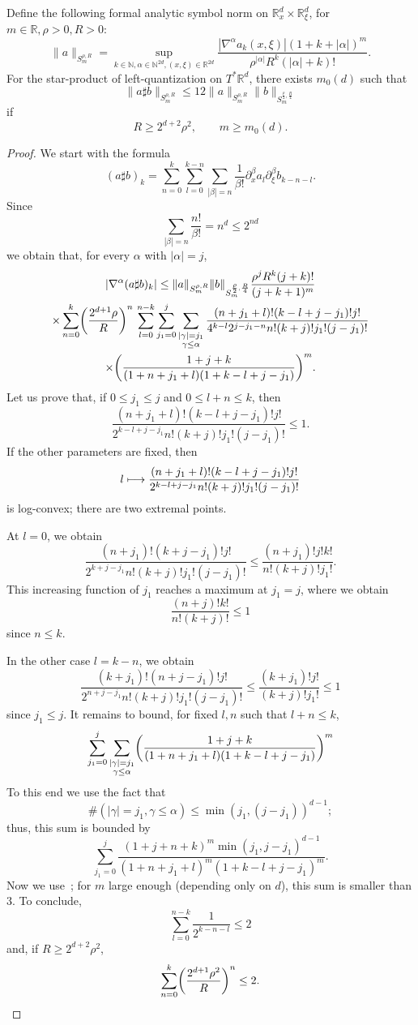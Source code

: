 \documentclass[AHL,Unicode,longabstracts,published]{cedram}
\newcommand\1{\mathds{1}}
\newcommand{\R}{\mathbb{R}}
\newcommand{\N}{\mathbb{N}}
\let\oldmapsto\mapsto
\renewcommand*{\mapsto}{\mathchoice{\longmapsto}{\oldmapsto}{\oldmapsto}{\oldmapsto}}
\let\originalleft\left
\let\originalright\right
\renewcommand{\left}{\mathopen{}\mathclose\bgroup\originalleft}
\renewcommand{\right}{\aftergroup\egroup\originalright}
\begin{document}
\begin{prop}\label{prop:composition-formal}
Define the following formal analytic symbol norm on $\R^{d}_x\times \R^d_{\xi}$, for $m\in \R, \rho>0,R>0$:
\[
\|a\|_{S^{\rho,R}_m}=\sup_{k\in \N, \alpha\in \N^{2d}, (x,\xi)\in
\R^{2d}}\frac{|\nabla^{\alpha}a_k(x,\xi)|(1+k+|\alpha|)^m}{\rho^{|\alpha|}R^k(|\alpha|+k)!}.
\]
For the star-product of left-quantization on $T^*\R^d$, there exists $m_0(d)$ such that
\[
\|a\sharp b\|_{S^{\rho,R}_m}\leq 12\|a\|_{S^{\rho,R}_m}\|b\|_{S^{\frac{\rho}2,\frac R4}_m}
\]
if
\[
R\geq 2^{d+2}\rho^2, \qquad m\geq m_0(d).
\]
\end{prop}
\begin{proof}
We start with the formula
\[
(a\sharp b)_k=\sum_{n=0}^k\sum_{l=0}^{k-n}\sum_{|\beta|=n}\frac{1}{\beta!}\partial^\beta_xa_l\partial_{\xi}^{\beta}b_{k-n-l}.
\]
Since
\[
\sum_{|\beta|=n}\frac{n!}{\beta!}=n^d\leq 2^{nd}
\]
we obtain that, for every $\alpha$ with $|\alpha|=j$,
\begin{multline*}
\left|\nabla^{\alpha}(a\sharp b)_k\right|\leq
\|a\|_{S^{\rho,R}_m}\|b\|_{S^{\frac{\rho}2,\frac R4}_m}\frac{\rho^jR^k(j+k)!}{(j+k+1)^m} \\
\times \sum_{n=0}^k\left(\frac{2^{d+1}\rho}{R}\right)^n\,\sum_{l=0}^{n-k}\sum_{j_1=0}^j\sum_{\substack{|\gamma|=j_1\\
\gamma\leq
\alpha}}
\frac{(n+j_1+l)!(k-l+j-j_1)!j!}{4^{k-l}2^{j-j_1-n}n!(k+j)!j_1!(j-j_1)!}
\\ \times \left(\frac{1+j+k}{(1+n+j_1+l)(1+k-l+j-j_1)}\right)^m.
\end{multline*}
Let us prove that, if $0\leq j_1\leq j$ and $0\leq l+n\leq k$, then
\[
\frac{(n+j_1+l)!(k-l+j-j_1)!j!}{2^{k-l+j-j_1}n!(k+j)!j_1!(j-j_1)!}\leq 1.
\]
If the other parameters are fixed, then
\[
l\mapsto
\frac{(n+j_1+l)!(k-l+j-j_1)!j!}{2^{k-l+j-j_1}n!(k+j)!j_1!(j-j_1)!}
\]
is log-convex; there are two extremal points.



At \underline{$l=0$}, we obtain
\[
\frac{(n+j_1)!(k+j-j_1)!j!}{2^{k+j-j_1}n!(k+j)!j_1!(j-j_1)!}\leq
\frac{(n+j_1)!j!k!}{n!(k+j)!j_1!}.
\]
This increasing function of $j_1$ reaches a maximum at $j_1=j$, where we obtain
\[
\frac{(n+j)!k!}{n!(k+j)!}\leq 1
\]
since $n\leq k$.

In the other case \underline{$l=k-n$}, we obtain
\[
\frac{(k+j_1)!(n+j-j_1)!j!}{2^{n+j-j_1}n!(k+j)!j_1!(j-j_1)!}\leq
\frac{(k+j_1)!j!}{(k+j)!j_1!}\leq 1
\]
since $j_1\leq j$. It remains to bound, for fixed $l,n$ such that $l+n\leq k$,
\[
\sum_{j_1=0}^j\sum_{\substack{|\gamma|=j_1\\ \gamma\leq
\alpha}}\left(\frac{1+j+k}{(1+n+j_1+l)(1+k-l+j-j_1)}\right)^m
\]
To this end we use the fact that
\[
\#(|\gamma|=j_1,\gamma\leq \alpha)\leq \min(j_1,(j-j_1))^{d-1};
\]
thus, this sum is bounded by
\[
\sum_{j_1=0}^j\frac{(1+j+n+k)^m\min(j_1,j-j_1)^{d-1}}{(1+n+j_1+l)^m(1+k-l+j-j_1)^m}.
\]
Now we use~\cite[Lemma~2.13]{deleporte_toeplitz_2018}; for $m$ large enough (depending only on $d$), this sum is smaller than $3$. To conclude,
\[
\sum_{l=0}^{n-k}\frac{1}{2^{k-n-l}}\leq 2
\]
and, if $R\geq 2^{d+2}\rho^2$,
\[
\sum_{n=0}^k\left(\frac{2^{d+1}\rho^2}{R}\right)^n\leq 2.\qedhere
\]
\end{proof}
\end{document}
